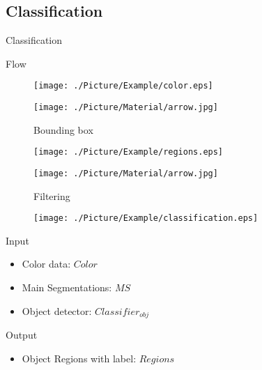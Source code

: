 \documentclass[xcolor=table,compress,blue]{beamer}
\begin{document}
\subsection{Classification}
\begin{frame}{Classification}
	\begin{exampleblock}{Flow}
		\begin{figure}[htpb]
			\centering
			\begin{minipage}[b]{0.8in}
				\centerline{ \texttt{[image: ./Picture/Example/color.eps]} }
			\end{minipage}
			\begin{minipage}[b]{0.8in}
				\centerline{ \texttt{[image: ./Picture/Material/arrow.jpg]} }
				\centerline{\tiny{Bounding box}}
			\end{minipage}
			\begin{minipage}[b]{0.8in}
				\centerline{ \texttt{[image: ./Picture/Example/regions.eps]} }
			\end{minipage}
			\begin{minipage}[b]{0.8in}
				\centerline{ \texttt{[image: ./Picture/Material/arrow.jpg]} }
				\centerline{\tiny{Filtering}}
			\end{minipage}
			\begin{minipage}[b]{0.8in}
				\centerline{ \texttt{[image: ./Picture/Example/classification.eps]} }
			\end{minipage}
		\end{figure}
	\end{exampleblock}
	\begin{exampleblock}{Input}
		\begin{itemize}		
			\item Color data: $Color$	
			\item Main Segmentations: $MS$ 
			\item Object detector: ${Classifier}_{obj}$
		\end{itemize}
	\end{exampleblock}
	\begin{exampleblock}{Output}
		\begin{itemize}
			\item Object Regions with label: $Regions$
		\end{itemize}
	\end{exampleblock}
\end{frame}
\end{document}
